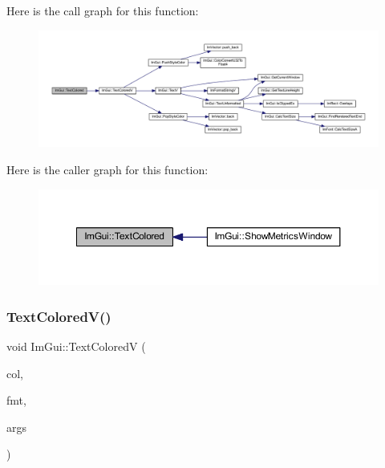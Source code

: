 Here is the call graph for this function\+:
\nopagebreak
\begin{figure}[H]
\begin{center}
\leavevmode
\includegraphics[width=350pt]{namespace_im_gui_a36ab8fcad68b26863d6e910755de04c2_cgraph}
\end{center}
\end{figure}
Here is the caller graph for this function\+:
\nopagebreak
\begin{figure}[H]
\begin{center}
\leavevmode
\includegraphics[width=350pt]{namespace_im_gui_a36ab8fcad68b26863d6e910755de04c2_icgraph}
\end{center}
\end{figure}
\mbox{\label{namespace_im_gui_a87c24ece994188a7145d8feecb4439ed}} 
\subsubsection{\texorpdfstring{Text\+Colored\+V()}{TextColoredV()}}
{\footnotesize\ttfamily void Im\+Gui\+::\+Text\+ColoredV (\begin{DoxyParamCaption}\item[{const \mbox{\hyperlink{struct_im_vec4}{Im\+Vec4}} \&}]{col,  }\item[{const char $\ast$}]{fmt,  }\item[{va\+\_\+list}]{args }\end{DoxyParamCaption})}

